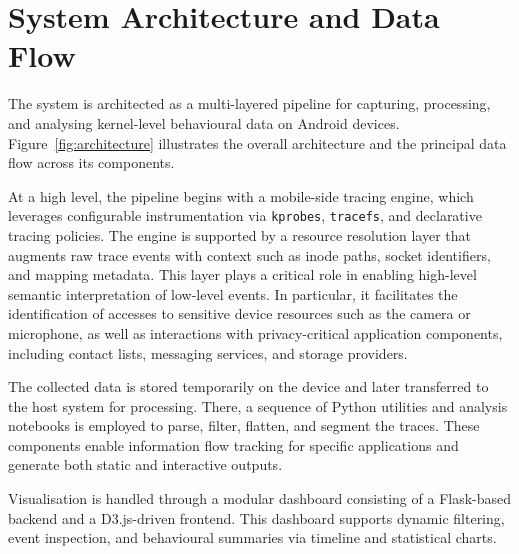 \documentclass[a4paper,12pt]{report}
\begin{document}
\section{System Architecture and Data Flow}

The system is architected as a multi-layered pipeline for capturing, processing, and analysing kernel-level behavioural data on Android devices. Figure~\ref{fig:architecture} illustrates the overall architecture and the principal data flow across its components.

At a high level, the pipeline begins with a mobile-side tracing engine, which leverages configurable instrumentation via \texttt{kprobes}, \texttt{tracefs}, and declarative tracing policies. The engine is supported by a resource resolution layer that augments raw trace events with context such as inode paths, socket identifiers, and mapping metadata. This layer plays a critical role in enabling high-level semantic interpretation of low-level events. In particular, it facilitates the identification of accesses to sensitive device resources such as the camera or microphone, as well as interactions with privacy-critical application components, including contact lists, messaging services, and storage providers.

The collected data is stored temporarily on the device and later transferred to the host system for processing. There, a sequence of Python utilities and analysis notebooks is employed to parse, filter, flatten, and segment the traces. These components enable information flow tracking for specific applications and generate both static and interactive outputs.

Visualisation is handled through a modular dashboard consisting of a Flask-based backend and a D3.js-driven frontend. This dashboard supports dynamic filtering, event inspection, and behavioural summaries via timeline and statistical charts.
\end{document}
